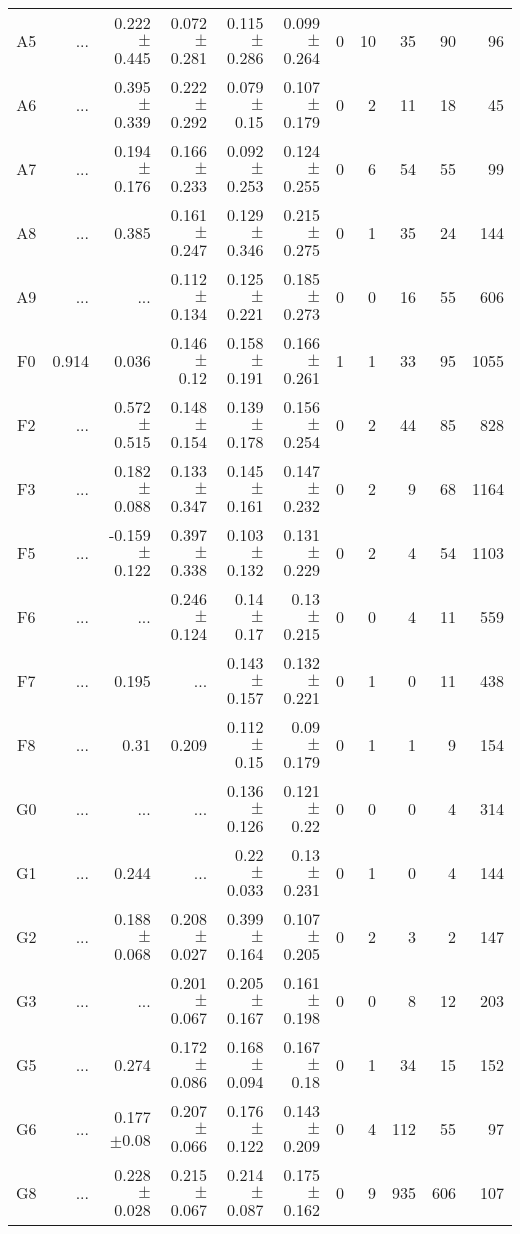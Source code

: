 \begin{table}[t]
\begin{center}
\begin{tabular}{c|rrrrr|rrrrr}
A5	&	 ...	&	0.222$\pm$0.445	&	0.072$\pm$0.281	&	0.115$\pm$0.286	&	0.099$\pm$0.264	&	0	&	10	&	35	&	90	&	96	\\
A6	&	 ...	&	0.395$\pm$0.339	&	0.222$\pm$0.292	&	0.079$\pm$0.15	&	0.107$\pm$0.179	&	0	&	2	&	11	&	18	&	45	\\
A7	&	 ...	&	0.194$\pm$0.176	&	0.166$\pm$0.233	&	0.092$\pm$0.253	&	0.124$\pm$0.255	&	0	&	6	&	54	&	55	&	99	\\
A8	&	 ...	&	0.385	&	0.161$\pm$0.247	&	0.129$\pm$0.346	&	0.215$\pm$0.275	&	0	&	1	&	35	&	24	&	144	\\
A9	&	 ...	&	 ...	&	0.112$\pm$0.134	&	0.125$\pm$0.221	&	0.185$\pm$0.273	&	0	&	0	&	16	&	55	&	606	\\
F0	&	0.914	&	0.036	&	0.146$\pm$0.12	&	0.158$\pm$0.191	&	0.166$\pm$0.261	&	1	&	1	&	33	&	95	&	1055	\\
F2	&	 ...	&	0.572$\pm$0.515	&	0.148$\pm$0.154	&	0.139$\pm$0.178	&	0.156$\pm$0.254	&	0	&	2	&	44	&	85	&	828	\\
F3	&	 ...	&	0.182$\pm$0.088	&	0.133$\pm$0.347	&	0.145$\pm$0.161	&	0.147$\pm$0.232	&	0	&	2	&	9	&	68	&	1164	\\
F5	&	 ...	&	-0.159$\pm$0.122	&	0.397$\pm$0.338	&	0.103$\pm$0.132	&	0.131$\pm$0.229	&	0	&	2	&	4	&	54	&	1103	\\
F6	&	 ...	&	 ...	&	0.246$\pm$0.124	&	0.14$\pm$0.17	&	0.13$\pm$0.215	&	0	&	0	&	4	&	11	&	559	\\
F7	&	 ...	&	0.195	&	 ...	&	0.143$\pm$0.157	&	0.132$\pm$0.221	&	0	&	1	&	0	&	11	&	438	\\
F8	&	 ...	&	0.31	&	0.209	&	0.112$\pm$0.15	&	0.09$\pm$0.179	&	0	&	1	&	1	&	9	&	154	\\
G0	&	 ...	&	 ...	&	 ...	&	0.136$\pm$0.126	&	0.121$\pm$0.22	&	0	&	0	&	0	&	4	&	314	\\
G1	&	 ...	&	0.244	&	 ...	&	0.22$\pm$0.033	&	0.13$\pm$0.231	&	0	&	1	&	0	&	4	&	144	\\
G2	&	 ...	&	0.188$\pm$0.068	&	0.208$\pm$0.027	&	0.399$\pm$0.164	&	0.107$\pm$0.205	&	0	&	2	&	3	&	2	&	147	\\
G3	&	 ...	&	 ...	&	0.201$\pm$0.067	&	0.205$\pm$0.167	&	0.161$\pm$0.198	&	0	&	0	&	8	&	12	&	203	\\
G5	&	 ...	&	0.274	&	0.172$\pm$0.086	&	0.168$\pm$0.094	&	0.167$\pm$0.18	&	0	&	1	&	34	&	15	&	152	\\
G6	&	 ...	&	0.177$\pm$0.08	&	0.207$\pm$0.066	&	0.176$\pm$0.122	&	0.143$\pm$0.209	&	0	&	4	&	112	&	55	&	97	\\
G8	&	 ...	&	0.228$\pm$0.028	&	0.215$\pm$0.067	&	0.214$\pm$0.087	&	0.175$\pm$0.162	&	0	&	9	&	935	&	606	&	107	\\

\end{tabular}
\end{center}
\end{table}
